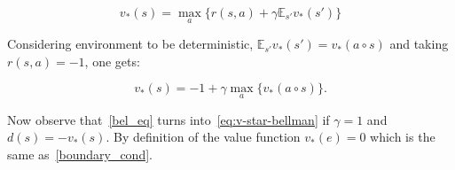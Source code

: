 \documentclass[reqno,11pt]{amsart}
\begin{document}
$$
 v_*(s) = \max\limits_a \big\{r(s, a) + \gamma \mathbb E_{s'} v_*(s')\big\}
 $$

\noindent
Considering environment to be deterministic,  $\mathbb E_{s'} v_*(s') = v_*(a\circ s)$ and taking $r(s, a)  = -1$, one gets:

\begin{equation}
 \label{eq:v-star-bellman}
 v_*(s) =
 -1+ \gamma\max\limits_a \big\{v_*(a\circ s)\big\}.
 \end{equation}

\noindent
Now observe that~\eqref{bel_eq} turns into~\eqref{eq:v-star-bellman} if $\gamma = 1$ and $d(s) = -v_*(s)$. By definition of the value function $v_*(e) = 0$ which is the same as~\eqref{boundary_cond}.




\end{document}
